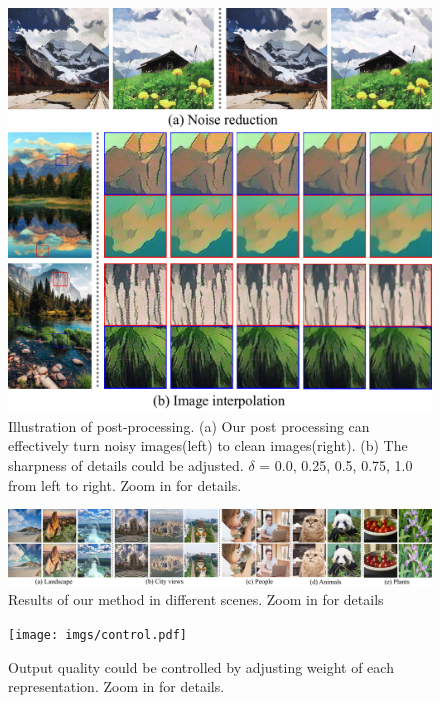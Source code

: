 \documentclass[10pt,twocolumn,letterpaper]{article}
\begin{document}
\begin{figure}[t]
\centering
\includegraphics[width=\linewidth]{imgs/post_process.pdf}
\caption{Illustration of post-processing. (a) Our post processing can effectively turn noisy images(left) to clean images(right). (b) The sharpness of details could be adjusted. $\delta$ = 0.0, 0.25, 0.5, 0.75, 1.0 from left to right. Zoom in for details.}
\label{fig:post_processing}
\vspace{-1em}
\end{figure}

\begin{figure}[t]
\centering
\includegraphics[width=\linewidth]{imgs/diverse_scenes.pdf}
\caption{Results of our method in different scenes. Zoom in for details}
\label{fig:diverse_scenes}
\vspace{-0.5em}
\end{figure}

\begin{figure}[htbp]
\centering
\texttt{[image: imgs/control.pdf]}
\caption{Output quality could be controlled by adjusting weight of each representation. Zoom in for details.}
\label{fig:figure5}
\vspace{-0.5em}
\end{figure}
\end{document}
